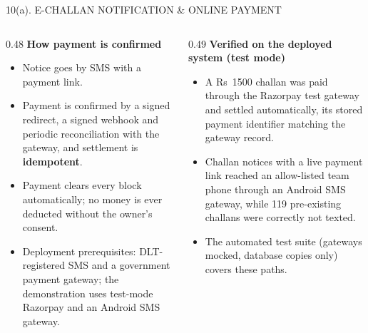 \documentclass[aspectratio=169,10pt,t]{beamer}
\newcommand{\hd}[1]{{\color{dsblue}\textbf{#1}}}          %
\begin{document}
\begin{frame}{10(a). E-CHALLAN NOTIFICATION \& ONLINE PAYMENT}
\vspace{0.5em}
\begin{columns}[T,onlytextwidth]
\begin{column}{0.48\textwidth}
\hd{\small How payment is confirmed}
\scriptsize
\begin{itemize}\setlength{\itemsep}{0.15em}
  \item Notice goes by SMS with a payment link.
  \item Payment is confirmed by a signed redirect, a signed webhook and periodic reconciliation with the gateway,
        and settlement is \textbf{idempotent}.
  \item Payment clears every block automatically; no money is ever deducted without the owner's consent.
  \item Deployment prerequisites: DLT-registered SMS and a government payment gateway; the demonstration uses
        test-mode Razorpay and an Android SMS gateway.
\end{itemize}
\end{column}
\begin{column}{0.49\textwidth}
\hd{\small Verified on the deployed system (test mode)}
\scriptsize
\begin{itemize}\setlength{\itemsep}{0.15em}
  \item A Rs~1500 challan was paid through the Razorpay test gateway and settled automatically, its stored payment
        identifier matching the gateway record.
  \item Challan notices with a live payment link reached an allow-listed team phone through an Android SMS gateway,
        while 119 pre-existing challans were correctly not texted.
  \item The automated test suite (gateways mocked, database copies only) covers these paths.
\end{itemize}
\end{column}
\end{columns}
\end{frame}
\end{document}
